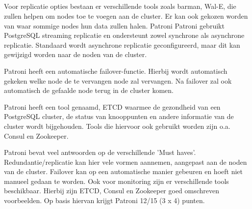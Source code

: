 


\subsection{}
\label{subsec: Oplossing 1: Patroni}

\subsubsection{}
\label{subsubsec:Must have}

Voor replicatie opties bestaan er verschillende tools zoals barman, Wal-E, die zullen helpen om nodes toe te voegen aan de cluster. Er kan ook gekozen worden van waar sommige nodes hun data zullen halen. Patroni Patroni gebruikt PostgreSQL streaming replicatie en ondersteunt zowel synchrone als asynchrone replicatie. Standaard wordt asynchrone replicatie geconfigureerd, maar dit kan gewijzigd worden naar de noden van de cluster.

Patroni heeft een automatische failover-functie. Hierbij wordt automatisch gekeken welke node de te vervangen node zal vervangen. Na failover zal ook automatisch de gefaalde node terug in de cluster komen.

Patroni heeft een tool genaamd, ETCD waarmee de gezondheid van een PostgreSQL cluster, de status van knooppunten en andere informatie van de cluster wordt bijgehouden. Tools die hiervoor ook gebruikt worden zijn o.a. Consul en Zookeeper.

Patroni bevat veel antwoorden op de verschillende 'Must haves'. Redundantie/replicatie kan hier vele vormen aannemen, aangepast aan de noden van de cluster. Failover kan op een automatische manier gebeuren en hoeft niet manueel gedaan te worden. Ook voor monitoring zijn er verschillende tools beschikbaar. Hierbij zijn ETCD, Consul en Zookeeper goed omschreven voorbeelden.
Op basis hiervan krijgt Patroni 12/15 (3 x 4) punten.

\subsubsection{}
\label{subsubsec:Should have}

